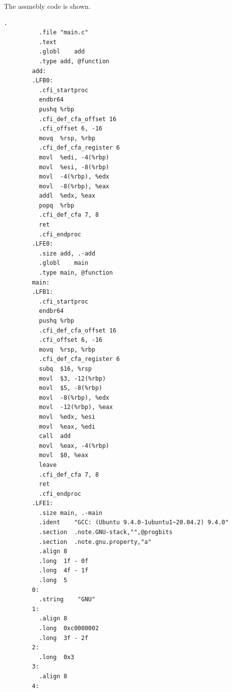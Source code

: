 \documentclass{article}
\begin{document}
    \begin{example}
      The assmebly code is shown. 
      \begin{lstlisting}[language={[x86masm]Assembler}]
        .
          .file	"main.c"
          .text
          .globl	add
          .type	add, @function
        add:
        .LFB0:
          .cfi_startproc
          endbr64
          pushq	%rbp
          .cfi_def_cfa_offset 16
          .cfi_offset 6, -16
          movq	%rsp, %rbp
          .cfi_def_cfa_register 6
          movl	%edi, -4(%rbp)
          movl	%esi, -8(%rbp)
          movl	-4(%rbp), %edx
          movl	-8(%rbp), %eax
          addl	%edx, %eax
          popq	%rbp
          .cfi_def_cfa 7, 8
          ret
          .cfi_endproc
        .LFE0:
          .size	add, .-add
          .globl	main
          .type	main, @function
        main:
        .LFB1:
          .cfi_startproc
          endbr64
          pushq	%rbp
          .cfi_def_cfa_offset 16
          .cfi_offset 6, -16
          movq	%rsp, %rbp
          .cfi_def_cfa_register 6
          subq	$16, %rsp
          movl	$3, -12(%rbp)
          movl	$5, -8(%rbp)
          movl	-8(%rbp), %edx
          movl	-12(%rbp), %eax
          movl	%edx, %esi
          movl	%eax, %edi
          call	add
          movl	%eax, -4(%rbp)
          movl	$0, %eax
          leave
          .cfi_def_cfa 7, 8
          ret
          .cfi_endproc
        .LFE1:
          .size	main, .-main
          .ident	"GCC: (Ubuntu 9.4.0-1ubuntu1~20.04.2) 9.4.0"
          .section	.note.GNU-stack,"",@progbits
          .section	.note.gnu.property,"a"
          .align 8
          .long	 1f - 0f
          .long	 4f - 1f
          .long	 5
        0:
          .string	 "GNU"
        1:
          .align 8
          .long	 0xc0000002
          .long	 3f - 2f
        2:
          .long	 0x3
        3:
          .align 8
        4:
      \end{lstlisting}
    \end{example}
\end{document}
